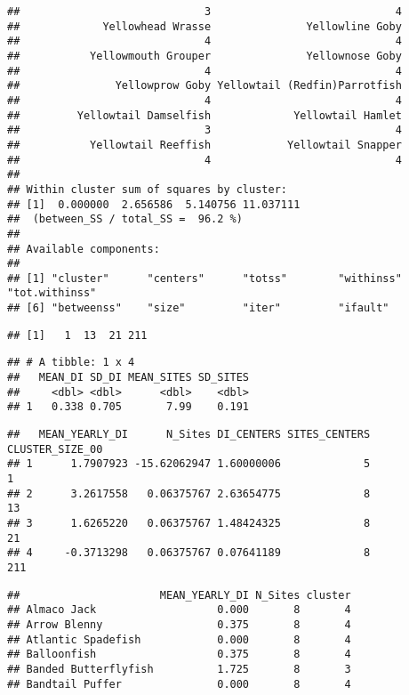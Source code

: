 \documentclass[
]{article}
\begin{document}
\begin{verbatim}
##                             3                             4 
##             Yellowhead Wrasse               Yellowline Goby 
##                             4                             4 
##           Yellowmouth Grouper               Yellownose Goby 
##                             4                             4 
##               Yellowprow Goby Yellowtail (Redfin)Parrotfish 
##                             4                             4 
##         Yellowtail Damselfish             Yellowtail Hamlet 
##                             3                             4 
##           Yellowtail Reeffish            Yellowtail Snapper 
##                             4                             4 
## 
## Within cluster sum of squares by cluster:
## [1]  0.000000  2.656586  5.140756 11.037111
##  (between_SS / total_SS =  96.2 %)
## 
## Available components:
## 
## [1] "cluster"      "centers"      "totss"        "withinss"     "tot.withinss"
## [6] "betweenss"    "size"         "iter"         "ifault"
\end{verbatim}

\begin{verbatim}
## [1]   1  13  21 211
\end{verbatim}

\begin{verbatim}
## # A tibble: 1 x 4
##   MEAN_DI SD_DI MEAN_SITES SD_SITES
##     <dbl> <dbl>      <dbl>    <dbl>
## 1   0.338 0.705       7.99    0.191
\end{verbatim}

\begin{verbatim}
##   MEAN_YEARLY_DI      N_Sites DI_CENTERS SITES_CENTERS CLUSTER_SIZE_00
## 1      1.7907923 -15.62062947 1.60000006             5               1
## 2      3.2617558   0.06375767 2.63654775             8              13
## 3      1.6265220   0.06375767 1.48424325             8              21
## 4     -0.3713298   0.06375767 0.07641189             8             211
\end{verbatim}

\begin{verbatim}
##                      MEAN_YEARLY_DI N_Sites cluster
## Almaco Jack                   0.000       8       4
## Arrow Blenny                  0.375       8       4
## Atlantic Spadefish            0.000       8       4
## Balloonfish                   0.375       8       4
## Banded Butterflyfish          1.725       8       3
## Bandtail Puffer               0.000       8       4
\end{verbatim}
\end{document}
